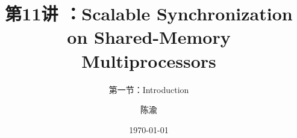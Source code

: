 


\title[第11讲]{第11讲 ：Scalable Synchronization on Shared-Memory Multiprocessors} %
\subtitle{第一节：Introduction }
\author{陈渝} %
\date{\today} %





\begin{frame}
\titlepage %
\end{frame}

